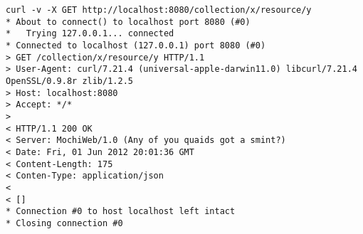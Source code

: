 \documentclass{report}
\begin{document}
\begin{verbatim}
curl -v -X GET http://localhost:8080/collection/x/resource/y
* About to connect() to localhost port 8080 (#0)
*   Trying 127.0.0.1... connected
* Connected to localhost (127.0.0.1) port 8080 (#0)
> GET /collection/x/resource/y HTTP/1.1
> User-Agent: curl/7.21.4 (universal-apple-darwin11.0) libcurl/7.21.4 OpenSSL/0.9.8r zlib/1.2.5
> Host: localhost:8080
> Accept: */*
> 
< HTTP/1.1 200 OK
< Server: MochiWeb/1.0 (Any of you quaids got a smint?)
< Date: Fri, 01 Jun 2012 20:01:36 GMT
< Content-Length: 175
< Conten-Type: application/json
< 
< []
* Connection #0 to host localhost left intact
* Closing connection #0
\end{verbatim}

   
\end{document}
